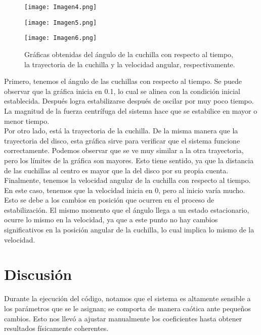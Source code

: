 \documentclass[12pt]{article}
\begin{document}
        
\begin{figure}[H]
    \centering
    \begin{minipage}[b]{0.3\textwidth}
    \texttt{[image: Imagen4.png]}
  \end{minipage}
  \hfill
  \begin{minipage}[b]{0.3\textwidth}
    \texttt{[image: Imagen5.png]}
  \end{minipage}
  \hfill
  \begin{minipage}[b]{0.3\textwidth}
    \texttt{[image: Imagen6.png]}
  \end{minipage}
    \caption{Gráficas obtenidas del ángulo de la cuchilla con respecto al tiempo, la trayectoria de la cuchilla y la velocidad angular, respectivamente.}
    \label{fig:enter-label}
\end{figure}

Primero, tenemos el ángulo de las cuchillas con respecto al tiempo. Se puede observar que la gráfica inicia en 0.1, lo cual se alinea con la condición inicial establecida. Después logra estabilizarse después de oscilar por muy poco tiempo. La magnitud de la fuerza centrífuga del sistema hace que se estabilice en mayor o menor tiempo.\\

	Por otro lado, está la trayectoria de la cuchilla. De la misma manera que la trayectoria del disco, esta gráfica sirve para verificar que el sistema funcione correctamente. Podemos observar que se ve muy similar a la otra trayectoria, pero los límites de la gráfica son mayores. Esto tiene sentido, ya que la distancia de las cuchillas al centro es mayor que la del disco por su propia cuenta.\\
    
	Finalmente, tenemos la velocidad angular de la cuchilla con respecto al tiempo. En este caso, tenemos que la velocidad inicia en 0, pero al inicio varía mucho. Esto se debe a los cambios en posición que ocurren en el proceso de estabilización. El mismo momento que el ángulo llega a un estado estacionario, ocurre lo mismo en la velocidad, ya que a este punto no hay cambios significativos en la posición angular de la cuchilla, lo cual implica lo mismo de la velocidad.

\section{Discusión}
Durante la ejecución del código, notamos que el sistema es altamente sensible a los parámetros que se le asignan; se comporta de manera caótica ante pequeños cambios. Esto nos llevó a ajustar manualmente los coeficientes hasta obtener resultados físicamente coherentes.\\
\end{document}
